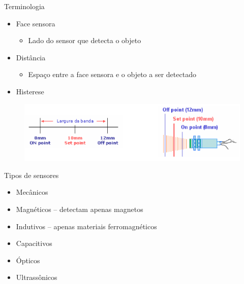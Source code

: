 \documentclass[aspectratio=169,
				xcolor=table]{beamer}
\begin{document}
		\begin{frame}{Terminologia}
			\begin{itemize}
				\item Face sensora
				\begin{itemize}
					\item Lado do sensor que detecta o objeto
				\end{itemize}
				\vspace{.75em}
				\item Distância
				\begin{itemize}
					\item Espaço entre a face sensora e o objeto a ser detectado
				\end{itemize}
				\vspace{.75em}
				\item Histerese
			\end{itemize}
			\begin{figure}
				\centering
				\includegraphics[scale=.4]{../figs/cap03/Imagem14}	
			\end{figure}
		\end{frame}
		
		\begin{frame}{Tipos de sensores}
			\begin{itemize}
				\item Mecânicos
				\vspace{.75em}
				\item Magnéticos – detectam apenas magnetos
				\vspace{.75em}
				\item Indutivos – apenas materiais ferromagnéticos
				\vspace{.75em}
				\item Capacitivos
				\vspace{.75em}
				\item Ópticos
				\vspace{.75em}
				\item Ultrassônicos
			\end{itemize}
		\end{frame}
		
\end{document}
